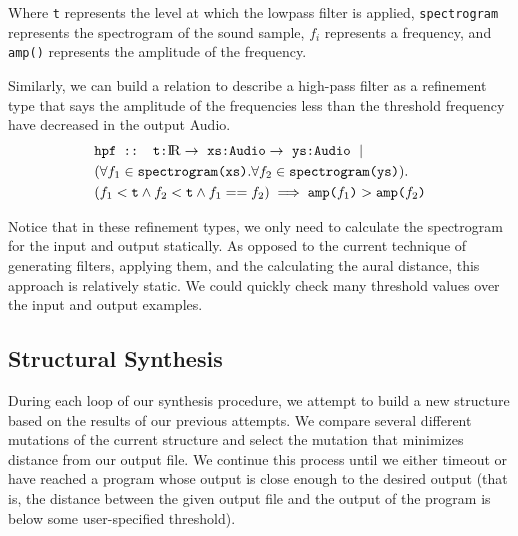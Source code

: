 Where \texttt{t} represents the level at which the lowpass filter is applied, \texttt{spectrogram} represents the spectrogram of the sound sample, $f_i$ represents a frequency, and \texttt{amp()} represents the amplitude of the frequency. 

Similarly, we can build a relation to describe a high-pass filter as a refinement type that says the amplitude of the frequencies less than the threshold frequency have decreased in the output Audio.
%
\begin{align*}
  &\texttt{hpf :: t:\reals} \to\ \texttt{xs:Audio} \to\ \texttt{ys:Audio}\ \mid \\
  &(\forall f_1 \in \texttt{spectrogram(xs)}. \forall f_2 \in \texttt{spectrogram(ys)}). \\
  &(f_1 < \texttt{t} \land f_2 < \texttt{t} \land f_1 == f_2) \implies \texttt{amp(}f_1\texttt{)} > \texttt{amp(} f_2 \texttt{)} 
\end{align*}

Notice that in these refinement types, we only need to calculate the spectrogram for the input and output statically.
As opposed to the current technique of generating filters, applying them, and the calculating the aural distance, this approach is relatively static.
We could quickly check many threshold values over the input and output examples.

\subsection{Structural Synthesis}

During each loop of our synthesis procedure, we attempt to build a new structure based on the results of our previous attempts.
We compare several different mutations of the current structure  and select the mutation that minimizes distance from our output file.
We continue this process until we either timeout or have reached a program whose output is close enough to the desired output (that is, the distance between the given output file and the output of the program is below some user-specified threshold).
